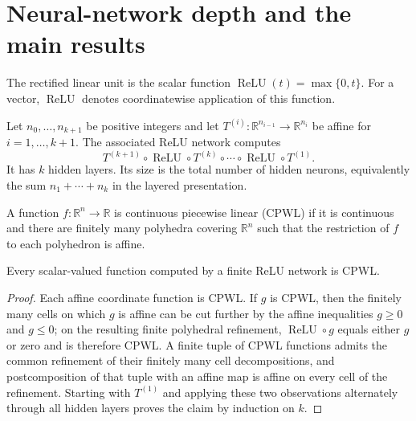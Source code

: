 
\newcommand{\R}{\mathbb{R}}
\newcommand{\CPWL}{\operatorname{CPWL}}
\newcommand{\ReLU}{\operatorname{ReLU}}
\newcommand{\MAX}{\operatorname{MAX}}
\newcommand{\PolyC}{\mathcal{P}}
\newcommand{\Tspace}{\mathcal{T}}

\chapter{Neural-network depth and the main results}

\begin{definition}
  \label{def:relu-scalar}
  The rectified linear unit is the scalar function
  $\ReLU(t)=\max\{0,t\}$.  For a vector, $\ReLU$ denotes coordinatewise
  application of this function.
\end{definition}

\begin{definition}
  \label{def:relu-network}
  Let $n_0,\ldots,n_{k+1}$ be positive integers and let
  $T^{(i)}:\R^{n_{i-1}}\to\R^{n_i}$ be affine for
  $i=1,\ldots,k+1$.  The associated ReLU network computes
  \[
    T^{(k+1)}\circ\ReLU\circ T^{(k)}\circ\cdots\circ
    \ReLU\circ T^{(1)}.
  \]
  It has $k$ hidden layers.  Its size is the total number of hidden neurons,
  equivalently the sum $n_1+\cdots+n_k$ in the layered presentation.
\end{definition}

\begin{definition}
  \label{def:cpwl-function}
  A function $f:\R^n\to\R$ is continuous piecewise linear (CPWL) if it is
  continuous and there are finitely many polyhedra covering $\R^n$ such that
  the restriction of $f$ to each polyhedron is affine.
\end{definition}

\begin{lemma}
  \label{lem:relu-network-is-cpwl}
  Every scalar-valued function computed by a finite ReLU network is CPWL.
\end{lemma}
\begin{proof}
  Each affine coordinate function is CPWL.  If $g$ is CPWL, then the finitely
  many cells on which $g$ is affine can be cut further by the affine
  inequalities $g\geq0$ and $g\leq0$; on the resulting finite polyhedral
  refinement, $\ReLU\circ g$ equals either $g$ or zero and is therefore CPWL.
  A finite tuple of CPWL functions admits the common refinement of their
  finitely many cell decompositions, and postcomposition of that tuple with an
  affine map is affine on every cell of the refinement.  Starting with
  $T^{(1)}$ and applying these two observations alternately through all hidden
  layers proves the claim by induction on $k$.
\end{proof}

